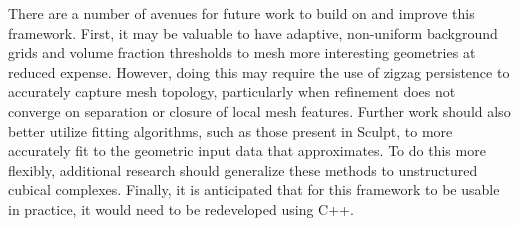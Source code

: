 There are a number of avenues for future work to build on and improve this framework.
First, it may be valuable to have adaptive, non-uniform background grids and volume fraction thresholds to mesh more interesting geometries at reduced expense.
However, doing this may require the use of zigzag persistence to accurately capture mesh topology, particularly when refinement does not converge on separation or closure of local mesh features.
Further work should also better utilize fitting algorithms, such as those present in Sculpt, to more accurately fit to the geometric input data that \briancode{} approximates.
To do this more flexibly, additional research should generalize these methods to unstructured cubical complexes.
Finally, it is anticipated that for this framework to be usable in practice, it would need to be redeveloped using C++.
%

%
